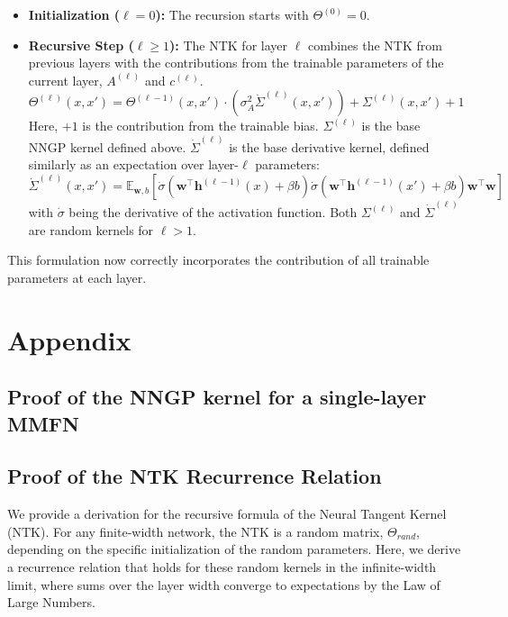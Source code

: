 \documentclass[12pt]{article}
\begin{document}
\begin{itemize}
    \item \textbf{Initialization (\(\ell=0\)):} The recursion starts with $\Theta^{(0)} = 0$.
    
    \item \textbf{Recursive Step (\(\ell \ge 1\)):} The NTK for layer $\ell$ combines the NTK from previous layers with the contributions from the trainable parameters of the current layer, $A^{(\ell)}$ and $c^{(\ell)}$.
    \begin{equation}
        \boxed{
        \Theta^{(\ell)}(x, x') = \Theta^{(\ell-1)}(x, x') \cdot \left(\sigma_A^2\dot{\Sigma}^{(\ell)}(x, x')\right) + \Sigma^{(\ell)}(x, x') +1
        }
    \end{equation}
    Here, $+1$ is the contribution from the trainable bias. $\Sigma^{(\ell)}$ is the base NNGP kernel defined above. $\dot{\Sigma}^{(\ell)}$ is the base derivative kernel, defined similarly as an expectation over layer-$\ell$ parameters:
    \begin{equation}
        \dot{\Sigma}^{(\ell)}(x, x') = \mathbb{E}_{\bm{w}, b} \left[ \dot{\sigma}\left(\bm{w}^\top \bm{h}^{(\ell-1)}(x) + \beta b\right) \dot{\sigma}\left(\bm{w}^\top \bm{h}^{(\ell-1)}(x') + \beta b\right) \bm{w}^\top\bm{w} \right]
    \end{equation}
    with $\dot{\sigma}$ being the derivative of the activation function. Both $\Sigma^{(\ell)}$ and $\dot{\Sigma}^{(\ell)}$ are random kernels for $\ell > 1$.
\end{itemize}
This formulation now correctly incorporates the contribution of all trainable parameters at each layer.



\newpage

\appendix
\section{Appendix}
\subsection{Proof of the NNGP kernel for a single-layer MMFN}

\subsection{Proof of the NTK Recurrence Relation}
We provide a derivation for the recursive formula of the Neural Tangent Kernel (NTK). For any finite-width network, the NTK is a random matrix, $\Theta_{rand}$, depending on the specific initialization of the random parameters. Here, we derive a recurrence relation that holds for these random kernels in the infinite-width limit, where sums over the layer width converge to expectations by the Law of Large Numbers.
\end{document}
